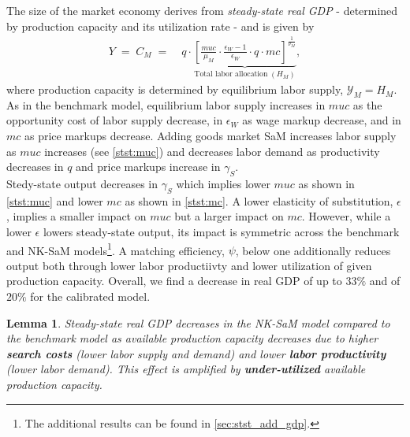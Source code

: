 \documentclass[12pt,3p,authoryear,review]{elsarticle}
\newtheorem{lemma}{Lemma}
\begin{document}
The size of the market economy derives from \emph{steady-state real GDP} - determined by production capacity and its utilization rate - and is given by%
\begin{align}%
	Y \; = \; C_M \; = & \; q \cdot \underbrace{\left[ \frac{muc}{\mu_M} \cdot \frac{\epsilon_W-1}{\epsilon_W} \cdot q \cdot mc \right]^{\frac{1}{\nu_M}}}_{\text{Total labor allocation} \; (H_M)},\label{eq:stst_gdp}%
\end{align}%
where production capacity is determined by equilibrium labor supply, $\mathcal{Y}_M = H_M$. As in the benchmark model, equilibrium labor supply increases in $muc$ as the opportunity cost of labor supply decrease, in $\epsilon_W$ as wage markup decrease, and in $mc$ as price markups decrease. Adding goods market SaM increases labor supply as $muc$ increases (see \eqref{stst:muc}) and decreases labor demand as productivity decreases in $q$ and price markups increase in $\gamma_S$.\\%
Stedy-state output decreases in $\gamma_S$ which implies lower $muc$ as shown in \eqref{stst:muc} and lower $mc$ as shown in \eqref{stst:mc}. A lower elasticity of substitution, $\epsilon$, implies a smaller impact on $muc$ but a larger impact on $mc$. However, while a lower $\epsilon$ lowers steady-state output, its impact is symmetric across the benchmark and NK-SaM models\footnote{The additional results can be found in \ref{sec:stst_add_gdp}.}. A matching efficiency, $\psi$, below one additionally reduces output both through lower labor productiivty and lower utilization of given production capacity. Overall, we find a decrease in real GDP of up to $33\%$ and of $20\%$ for the calibrated model.%
\begin{lemma}%
	Steady-state real GDP decreases in the NK-SaM model compared to the benchmark model as available production capacity decreases due to higher \textbf{search costs} (lower labor supply and demand) and lower \textbf{labor productivity} (lower labor demand). This effect is amplified by \textbf{under-utilized} available production capacity.%
\end{lemma}%
\end{document}
